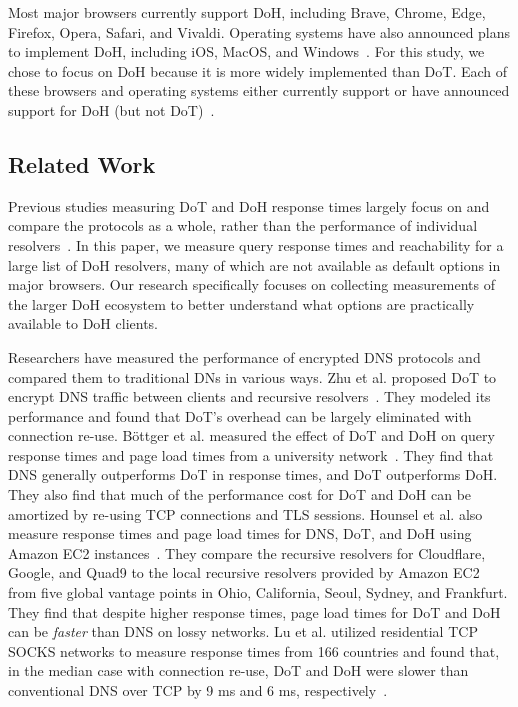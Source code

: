 Most major browsers currently support DoH, including Brave, Chrome, Edge,
Firefox, Opera, Safari, and Vivaldi.  Operating systems have also announced
plans to implement DoH, including iOS, MacOS, and
Windows~\cite{ffSettings,operaEdgeSettings,vivaldiSettings,iosSettings,jensen2020windows}.
For this study, we chose to focus on DoH because it is more widely implemented
than DoT.  Each of these browsers and operating systems either
currently support or have announced support for DoH (but not
DoT)~\cite{lack-of-dot-support}.

\subsection{Related Work}

Previous studies measuring DoT and DoH response times largely
focus on and compare the protocols as a whole, rather than the performance of
individual resolvers~\cite{lu2019end-to-end}.  
In this paper, we measure query response times and reachability for a large
list of DoH resolvers, many of which are not available as default options in
major browsers. 
Our research specifically
focuses on collecting measurements of the larger DoH ecosystem to better
understand what options are practically available to DoH clients.

Researchers have measured the performance of encrypted DNS protocols and compared them to traditional DNs in various ways.
Zhu et al. proposed DoT to encrypt DNS traffic between clients and recursive resolvers~\cite{zhu2015connection}.
They modeled its performance and found that DoT's overhead can be largely eliminated with connection re-use.
Böttger et al. measured the effect of DoT and DoH on query response times and page load times from a university network~\cite{boettger2019empirical}.
They find that DNS generally outperforms DoT in response times, and DoT outperforms DoH.
They also find that much of the performance cost for DoT and DoH can be amortized by re-using TCP connections and TLS sessions.
Hounsel et al. also measure response times and page load times for DNS, DoT, and DoH using Amazon EC2 instances~\cite{hounsel2020comparing}.
They compare the recursive resolvers for Cloudflare, Google, and Quad9 to the local recursive resolvers provided by Amazon EC2 from five global vantage points in Ohio, California, Seoul, Sydney, and Frankfurt.
They find that despite higher response times, page load times for DoT and DoH can be \emph{faster} than DNS on lossy networks.
Lu et al. utilized residential TCP SOCKS networks to measure response times from 166 countries and found that, in the median case with connection re-use, DoT and DoH were slower than conventional DNS over TCP by 9 ms and 6 ms, respectively~\cite{lu2019end}.

